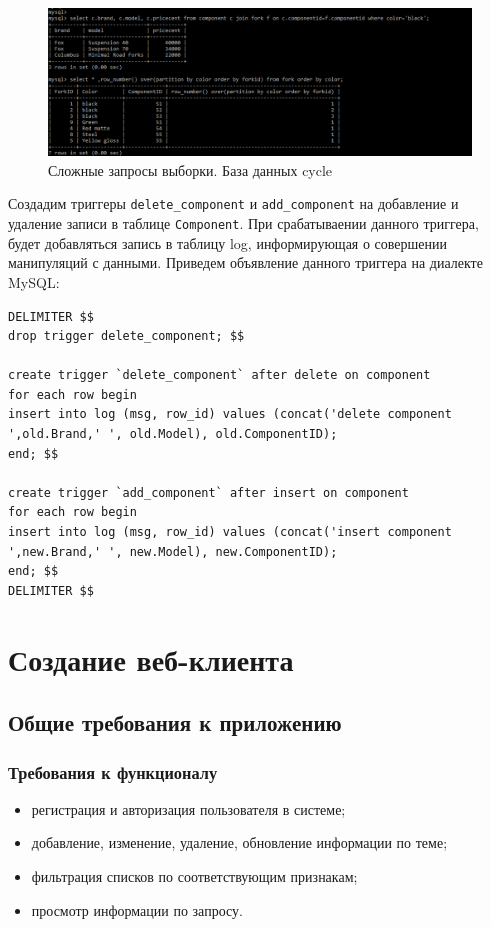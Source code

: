 \documentclass[a4paper,14pt]{extarticle}
\begin{document}
\begin{figure}[h!]
	\centering
	\includegraphics[width=0.7\linewidth]{images/join-window-cycle}
	\caption{Сложные запросы выборки. База данных cycle}
	\label{fig:join-window-cycle}
\end{figure}


Создадим триггеры \texttt{delete\_component} и  \texttt{add\_component} на добавление и удаление записи в таблице \texttt{Component}. При срабатываении данного триггера, будет добавляться запись в таблицу log, информирующая о совершении манипуляций с данными.
\newpage
Приведем объявление данного триггера на диалекте MySQL:
\lstset{
	language=sql
}
\begin{lstlisting}[caption=Триггер]
DELIMITER $$
drop trigger delete_component; $$

create trigger `delete_component` after delete on component
for each row begin
insert into log (msg, row_id) values (concat('delete component ',old.Brand,' ', old.Model), old.ComponentID);
end; $$

create trigger `add_component` after insert on component
for each row begin
insert into log (msg, row_id) values (concat('insert component ',new.Brand,' ', new.Model), new.ComponentID);
end; $$
DELIMITER $$
\end{lstlisting}

\section{Создание веб-клиента}

\subsection{Общие требования к приложению}

\subsubsection*{Требования к функционалу}
\begin{itemize}
	\item регистрация и авторизация пользователя в системе;
	\item добавление, изменение, удаление, обновление информации по
	теме;
	\item фильтрация списков по соответствующим признакам;
	\item просмотр информации по запросу.
\end{itemize}
\end{document}
